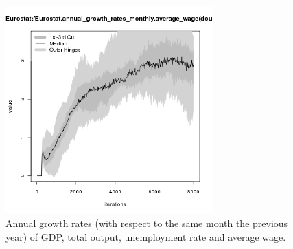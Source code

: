 \begin{figure}[H!]
\begin{minipage}{17cm}
\includegraphics[width=8cm]{./benchmark_plots/Eurostat-annual_growth_rates_monthly-average_wage.png}
\end{minipage}
\caption{Annual growth rates (with respect to the same month the previous year) of GDP, total output, unemployment rate and average wage.}
\label{Figure: Eurostat macrodata growth rates}
\end{figure}
\clearpage

